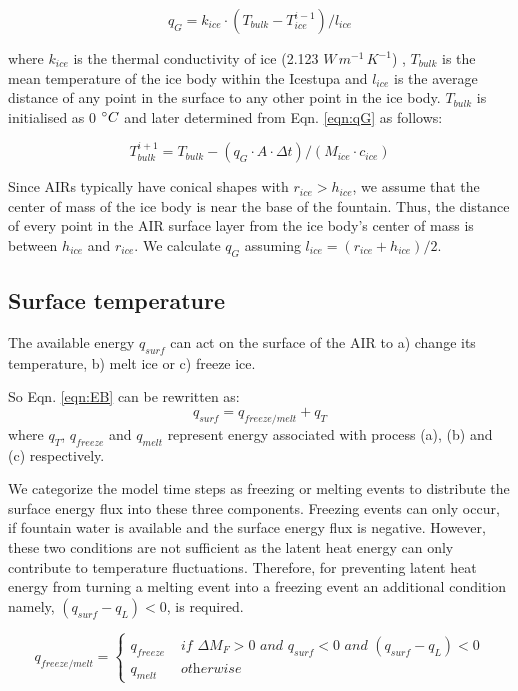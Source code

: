 \documentclass[utf8]{frontiersSCNS} %
\begin{document}
\begin{equation} q_{G} = k_{ice} \cdot (T_{bulk}-T_{ice}^{i-1})/l_{ice} \label{eqn:qG}    \end{equation}

where $k_{ice}$ is the thermal conductivity of ice (2.123 $W\, m^{-1}\,K^{-1}$) , $T_{bulk}$ is the mean temperature of
the ice body within the Icestupa and $l_{ice}$ is the average distance of any point in the surface to any other point in
the ice body. $T_{bulk}$ is initialised as 0 $\degree C$ and later determined from Eqn. \ref{eqn:qG} as follows:

\begin{equation} T_{bulk}^{i+1} = T_{bulk} - (q_{G} \cdot A \cdot \Delta t)/(M_{ice} \cdot c_{ice}) \end{equation}

Since AIRs typically have conical shapes with $r_{ice} > h_{ice}$, we assume that the center of mass of the ice body is
near the base of the fountain. Thus, the distance of every point in the AIR surface layer from the ice body's center of
mass is between $h_{ice}$ and $r_{ice}$. We calculate $q_{G}$ assuming $l_{ice} = (r_{ice} + h_{ice})/2$.

\subsection{Surface temperature}

The available energy $q_{surf}$ can act on the surface of the AIR to a) change its temperature, b) melt ice or c) freeze
ice.

So Eqn. \ref{eqn:EB} can be rewritten as: \begin{equation} q_{surf} = q_{freeze/melt} + q_{T} \end{equation} where
$q_{T}$, $q_{freeze}$ and $q_{melt}$ represent energy associated with process (a), (b) and (c) respectively.

We categorize the model time steps as freezing or melting events to distribute the surface energy flux into these
three components. Freezing events can only occur, if fountain water is available and the surface energy flux is
negative. However, these two conditions are not sufficient as the latent heat energy can only contribute to
temperature fluctuations. Therefore, for preventing latent heat energy from turning a melting event into a freezing
event an additional condition namely, $(q_{surf}-q_{L}) < 0$, is required.

\begin{equation}
	q_{freeze/melt} = \left\{ \begin{array}{ll}
		q_{freeze} & \textit{ if } \Delta M_{F} > 0 \textit{ and } q_{surf} < 0 \textit{ and }(q_{surf}-q_{L}) < 0 \\
		q_{melt}   & \textit{ otherwise}
	\end{array} \right.
\end{equation}
\end{document}
